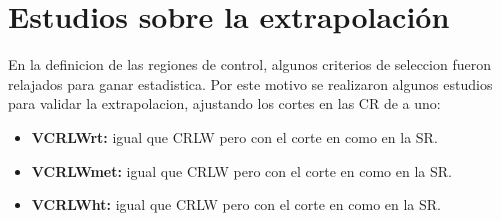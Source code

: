 


\section{Estudios sobre la extrapolación}

En la definicion de las regiones de control, algunos criterios
de seleccion fueron relajados para ganar estadistica. Por este
motivo se realizaron algunos estudios para validar la extrapolacion,
ajustando los cortes en las CR de a uno:

\begin{itemize}
\item \textbf{VCRLWrt:}  igual que CRLW pero con el corte en {\rt} como en la SR.
\item \textbf{VCRLWmet:} igual que CRLW pero con el corte en {\met} como en la SR.
\item \textbf{VCRLWht:}  igual que CRLW pero con el corte en {\HT} como en la SR.
\end{itemize}


